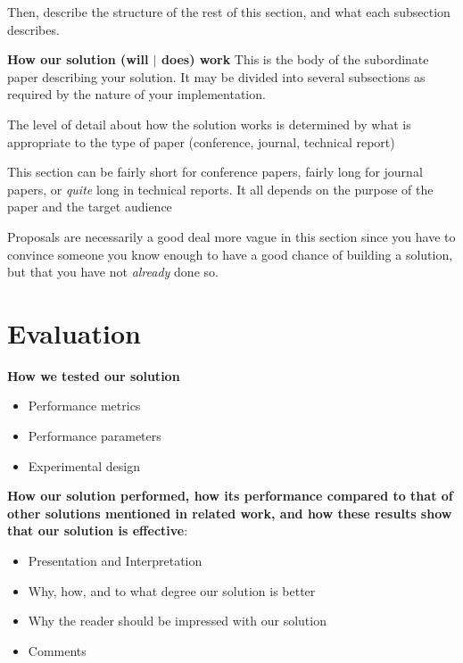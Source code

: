 \documentclass[pdf,bookmarks,colorlinks=true]{IEEEtran}
\begin{document}
Then, describe the structure of the rest of this section, and what each
subsection describes.


\textbf{How our solution (will $|$ does) work}
This is the body of the subordinate paper describing your solution. It
may be divided into several subsections as required by the nature of your
implementation.

The level of detail about how the solution works is determined by what
is appropriate to the type of paper (conference, journal, technical report)

This section can be fairly short for conference papers, fairly long for
journal papers, or {\em quite} long in technical reports. It all depends on the
purpose of the paper and the target audience

Proposals are necessarily a good deal more vague in this section since
you have to convince someone you know enough to have a good chance of building
a solution, but that you have not {\em already} done so.



\section{Evaluation}
\label{sec:Evaluation}

\textbf{How we tested our solution}
\begin{itemize}
\item   Performance metrics
\item   Performance parameters
\item   Experimental design
\end{itemize}


\textbf{How our solution performed, how its performance compared to
that of other solutions mentioned in related work, and how these results show
that our solution is effective}:

\begin{itemize}
\item   Presentation and Interpretation
\item   Why, how, and to what degree our solution is better
\item   Why the reader should be impressed with our solution
\item   Comments

\end{itemize}
\end{document}
